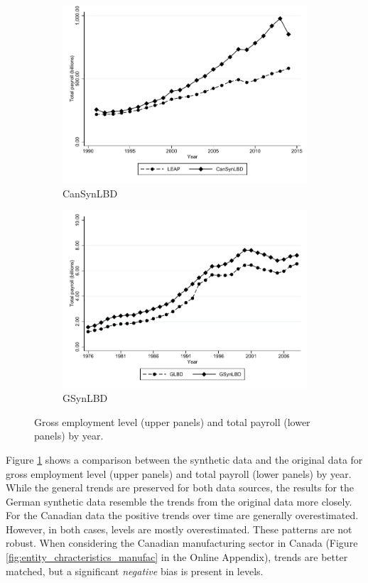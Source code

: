 \documentclass[10pt,twoside]{article}
\begin{document}
\begin{figure}[t]
\begin{subfigure}[h]{0.48\linewidth}
    \includegraphics[trim=0 0 0 -20,clip,width=\linewidth]{graphs/Total_payroll_by_year_private_bw.pdf}
   \caption{CanSynLBD}
   \end{subfigure}
\hfill
   \begin{subfigure}[h]{0.48\linewidth}
     \includegraphics[trim=0 0 0 -20,clip,width=\linewidth]{graphs/Total_payroll_by_year_bw_GsynLBD.pdf}
     \caption{GSynLBD}
   \end{subfigure}\caption{Gross employment level (upper panels) and total payroll (lower panels) by year.}\label{fig:entity_chracteristics}
\end{figure}
 
Figure \ref{fig:entity_chracteristics} shows a comparison between the synthetic data and the original data for gross employment level (upper panels) and total payroll (lower panels) by year. While the general trends are preserved for both data sources, the results for the German synthetic data resemble the trends from the original data more closely. For the Canadian data the positive trends over time are generally overestimated. However, in both cases, levels are mostly overestimated. These patterns are not robust. When considering the Canadian  manufacturing sector in Canada (Figure \ref{fig:entity_chracteristics_manufac} in the Online Appendix), trends are better matched, but a significant \textit{negative} bias is present in levels.
\end{document}
